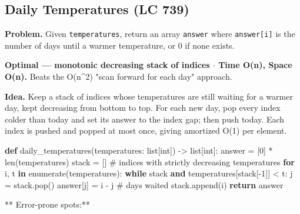 \documentclass[11pt]{article}
\newenvironment{Shaded}{\begin{snugshade}}{\end{snugshade}}
\newcommand{\BuiltInTok}[1]{\textcolor[rgb]{0.50,0.55,0.55}{#1}}
\newcommand{\CommentTok}[1]{\textcolor[rgb]{0.48,0.49,0.49}{#1}}
\newcommand{\ControlFlowTok}[1]{\textcolor[rgb]{0.99,0.74,0.29}{\textbf{#1}}}
\newcommand{\DecValTok}[1]{\textcolor[rgb]{0.96,0.45,0.00}{#1}}
\newcommand{\KeywordTok}[1]{\textcolor[rgb]{0.81,0.81,0.76}{\textbf{#1}}}
\newcommand{\NormalTok}[1]{\textcolor[rgb]{0.81,0.81,0.76}{#1}}
\newcommand{\OperatorTok}[1]{\textcolor[rgb]{0.81,0.81,0.76}{#1}}
\begin{document}
\subsection{Daily Temperatures (LC 739)}\label{daily-temperatures-lc-739}

\textbf{Problem.} Given \texttt{temperatures}, return an array \texttt{answer} where \texttt{answer{[}i{]}} is the number of days until a warmer temperature, or 0 if none exists.

\textbf{Optimal --- monotonic decreasing stack of indices \(\cdot\) Time O(n), Space O(n).} Beats the O(n\^{}2) "scan forward for each day" approach.

\textbf{Idea.} Keep a stack of indices whose temperatures are still waiting for a warmer day, kept decreasing from bottom to top. For each new day, pop every index colder than today and set its answer to the index gap; then push today. Each index is pushed and popped at most once, giving amortized O(1) per element.


\begin{Shaded}
\begin{Highlighting}[]
\KeywordTok{def}\NormalTok{ daily\_temperatures(temperatures: }\BuiltInTok{list}\NormalTok{[}\BuiltInTok{int}\NormalTok{]) }\OperatorTok{{-}\textgreater{}} \BuiltInTok{list}\NormalTok{[}\BuiltInTok{int}\NormalTok{]:}
\NormalTok{    answer }\OperatorTok{=}\NormalTok{ [}\DecValTok{0}\NormalTok{] }\OperatorTok{*} \BuiltInTok{len}\NormalTok{(temperatures)}
\NormalTok{    stack }\OperatorTok{=}\NormalTok{ []   }\CommentTok{\# indices with strictly decreasing temperatures}
    \ControlFlowTok{for}\NormalTok{ i, t }\KeywordTok{in} \BuiltInTok{enumerate}\NormalTok{(temperatures):}
        \ControlFlowTok{while}\NormalTok{ stack }\KeywordTok{and}\NormalTok{ temperatures[stack[}\OperatorTok{{-}}\DecValTok{1}\NormalTok{]] }\OperatorTok{\textless{}}\NormalTok{ t:}
\NormalTok{            j }\OperatorTok{=}\NormalTok{ stack.pop()}
\NormalTok{            answer[j] }\OperatorTok{=}\NormalTok{ i }\OperatorTok{{-}}\NormalTok{ j          }\CommentTok{\# days waited}
\NormalTok{        stack.append(i)}
    \ControlFlowTok{return}\NormalTok{ answer}
\end{Highlighting}
\end{Shaded}

** Error-prone spots:**
\end{document}
